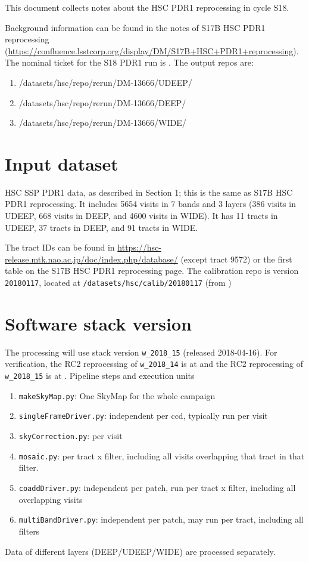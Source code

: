 

This document collects notes about the HSC PDR1 reprocessing in cycle S18.

Background information can be found in the notes of S17B HSC PDR1 reprocessing (\url{https://confluence.lsstcorp.org/display/DM/S17B+HSC+PDR1+reprocessing}).
The nominal ticket for the S18 PDR1 run is .
The output repos are:
\begin{enumerate}
\item /datasets/hsc/repo/rerun/DM-13666/UDEEP/
\item /datasets/hsc/repo/rerun/DM-13666/DEEP/
\item /datasets/hsc/repo/rerun/DM-13666/WIDE/
\end{enumerate}

\section{Input dataset}
HSC SSP PDR1 data, as described in  Section 1; this is the same as S17B HSC PDR1 reprocessing.
It includes 5654 visits in 7 bands and 3 layers (386 visits in UDEEP, 668 visits in DEEP, and 4600 visits in WIDE).
It has 11 tracts in UDEEP, 37 tracts in DEEP, and 91 tracts in WIDE.

The tract IDs can be found in \url{https://hsc-release.mtk.nao.ac.jp/doc/index.php/database/} (except tract 9572) or the first table on the S17B HSC PDR1 reprocessing page.
The calibration repo is version \texttt{20180117}, located at \texttt{/datasets/hsc/calib/20180117}  (from )

\section{Software stack version}
The processing will use stack version \texttt{w\_2018\_15} (released 2018-04-16).
For verification, the RC2 reprocessing of \texttt{w\_2018\_14} is at  and the RC2 reprocessing of \texttt{w\_2018\_15} is at .
Pipeline steps and execution units
\begin{enumerate}
\item \texttt{makeSkyMap.py}:   One SkyMap for the whole campaign
\item \texttt{singleFrameDriver.py}:   independent per ccd, typically run per visit
\item \texttt{skyCorrection.py}:   per visit
\item \texttt{mosaic.py}:   per tract x filter, including all visits overlapping that tract in that filter.
\item \texttt{coaddDriver.py}: independent per patch, run per tract x filter, including all overlapping visits
\item \texttt{multiBandDriver.py}:   independent per patch, may run per tract, including all filters
\end{enumerate}
Data of different layers (DEEP/UDEEP/WIDE) are processed separately.

